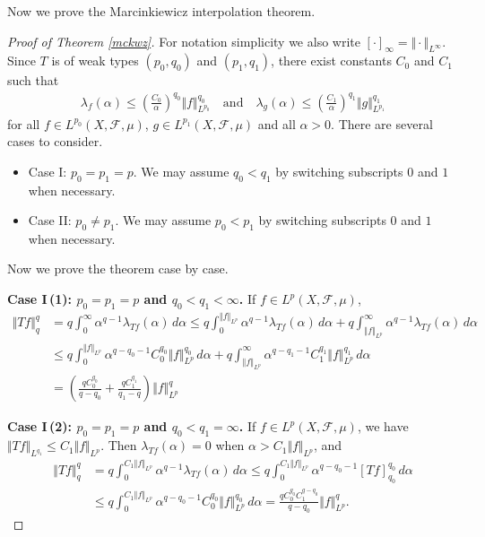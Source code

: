 \documentclass{article}
\numberwithin{equation}{section}
\newcommand{\scr}{\mathscr}
\theoremstyle{plain}
\theoremstyle{definition}
\begin{document}
Now we prove the Marcinkiewicz interpolation theorem.
\begin{proof}[Proof of Theorem \ref{mckwz}]
For notation simplicity we also write $[\cdot]_\infty=\Vert\cdot\Vert_{L^\infty}$. Since $T$ is of weak types $(p_0,q_0)$ and $(p_1,q_1)$, there exist constants $C_0$ and $C_1$ such that
\begin{align*}
	\lambda_{f}(\alpha)\leq \left(\frac{C_0}{\alpha}\right)^{q_0}\Vert f\Vert_{L^{p_0}}^{q_0}\quad\text{and}\quad \lambda_{g}(\alpha)\leq \left(\frac{C_1}{\alpha}\right)^{q_1}\Vert g\Vert_{L^{p_1}}^{q_1}
\end{align*}
for all $f\in L^{p_0}(X,\scr{F},\mu)$, $g\in L^{p_1}(X,\scr{F},\mu)$ and all $\alpha>0$. There are several cases to consider. 
\begin{itemize}
	\item Case I: $p_0=p_1=p$. We may assume $q_0<q_1$ by switching subscripts $0$ and $1$ when necessary.
	\item Case II: $p_0\neq p_1$. We may assume $p_0<p_1$ by switching subscripts $0$ and $1$ when necessary.
\end{itemize}

Now we prove the theorem case by case.
\item\textbf{Case I\,(1): $p_0=p_1=p$ and $q_0<q_1<\infty$.} If $f\in L^p(X,\scr{F},\mu)$,
\begin{align*}
	\Vert Tf\Vert_q^q&=q\int_{0}^\infty\alpha^{q-1}\lambda_{Tf}(\alpha)\,d\alpha\leq q\int_0^{\Vert f\Vert_{L^p}}\alpha^{q-1}\lambda_{Tf}(\alpha)\,d\alpha+q\int_{\Vert f\Vert_{L^p}}^\infty\alpha^{q-1}\lambda_{Tf}(\alpha)\,d\alpha\\
	&\leq q\int_0^{\Vert f\Vert_{L^p}}\alpha^{q-q_0-1} C_0^{q_0}\Vert f\Vert^{q_0}_{L^p}\,d\alpha+q\int_{\Vert f\Vert_{L^p}}^\infty\alpha^{q-q_1-1}C_1^{q_1}\Vert f\Vert^{q_1}_{L^p}\,d\alpha\\
	&=\left(\frac{qC_0^{q_0}}{q-q_0}+\frac{qC_1^{q_1}}{q_1-q}\right)\Vert f\Vert^{q}_{L^p}
\end{align*}
\item\textbf{Case I\,(2): $p_0=p_1=p$ and $q_0<q_1=\infty$.} If $f\in L^p(X,\scr{F},\mu)$, we have $\Vert Tf\Vert_{L^{q_1}}\leq C_1\Vert f\Vert_{L^p}$. Then $\lambda_{Tf}(\alpha)=0$ when $\alpha> C_1\Vert f\Vert_{L^p}$, and
\begin{align*}
	\Vert Tf\Vert_q^q&=q\int_{0}^{C_1\Vert f\Vert_{L^p}}\alpha^{q-1}\lambda_{Tf}(\alpha)\,d\alpha\leq q\int_0^{C_1\Vert f\Vert_{L^p}}\alpha^{q-q_0-1}[Tf]_{q_0}^{q_0}\,d\alpha\\
	&\leq q\int_0^{C_1\Vert f\Vert_{L^p}}\alpha^{q-q_0-1} C_0^{q_0}\Vert f\Vert^{q_0}_{L^p}\,d\alpha=\frac{qC_0^{q_0}C_1^{q-q_0}}{q-q_0}\Vert f\Vert^{q}_{L^p}.
\end{align*}


\end{proof}
\end{document}
